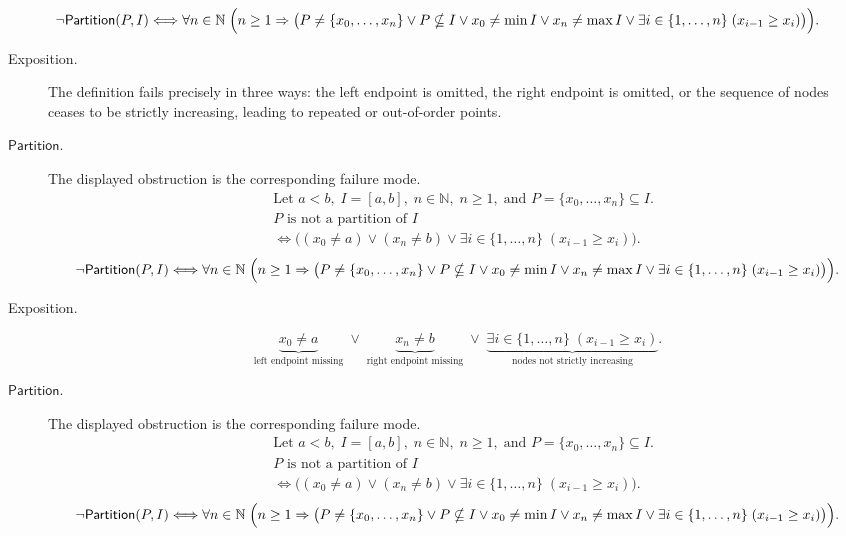 \begin{remark*}
\[
\neg\mathsf{Partition}(P,I) \Longleftrightarrow
\forall n\in\mathbb{N}\;\Bigl(n\ge 1 \Rightarrow
\bigl(P\ne\{x_0,\ldots,x_n\}\lor P\nsubseteq I
\lor x_0\ne\min I \lor x_n\ne\max I
\lor \exists i\in\{1,\ldots,n\}\;(x_{i-1}\ge x_i)\bigr)\Bigr).
\]
\end{remark*}

\begin{remark*}
\begin{description}
  \item[Exposition.]
The definition fails precisely in three ways: the left endpoint is omitted, the right endpoint is omitted, or the sequence of nodes ceases to be strictly increasing, leading to repeated or out-of-order points.


  \item[\(\mathsf{Partition}.\)]
  The displayed obstruction is the corresponding failure mode.
  \[
\begin{aligned}
&\text{Let } a<b,\; I=[a,b],\; n\in\mathbb{N},\; n\ge 1,\; \text{and } P=\{x_0,\ldots,x_n\}\subseteq I.\\
&P \text{ is not a partition of } I\\
&\Longleftrightarrow \bigl((x_0\ne a) \lor (x_n\ne b) \lor \exists i\in\{1,\ldots,n\}\;(x_{i-1}\ge x_i)\bigr).
\end{aligned}
  \]
  \[
\neg\mathsf{Partition}(P,I) \Longleftrightarrow
\forall n\in\mathbb{N}\;\Bigl(n\ge 1 \Rightarrow
\bigl(P\ne\{x_0,\ldots,x_n\}\lor P\nsubseteq I
\lor x_0\ne\min I \lor x_n\ne\max I
\lor \exists i\in\{1,\ldots,n\}\;(x_{i-1}\ge x_i)\bigr)\Bigr).
  \]
\end{description}
\end{remark*}

\begin{remark*}
\begin{description}
  \item[Exposition.]
\[
\underbrace{x_0\ne a}_{\text{left endpoint missing}}
\;\lor\;
\underbrace{x_n\ne b}_{\text{right endpoint missing}}
\;\lor\;
\underbrace{\exists i\in\{1,\ldots,n\}\;(x_{i-1}\ge x_i)}_{\text{nodes not strictly increasing}}.
\]


  \item[\(\mathsf{Partition}.\)]
  The displayed obstruction is the corresponding failure mode.
  \[
\begin{aligned}
&\text{Let } a<b,\; I=[a,b],\; n\in\mathbb{N},\; n\ge 1,\; \text{and } P=\{x_0,\ldots,x_n\}\subseteq I.\\
&P \text{ is not a partition of } I\\
&\Longleftrightarrow \bigl((x_0\ne a) \lor (x_n\ne b) \lor \exists i\in\{1,\ldots,n\}\;(x_{i-1}\ge x_i)\bigr).
\end{aligned}
  \]
  \[
\neg\mathsf{Partition}(P,I) \Longleftrightarrow
\forall n\in\mathbb{N}\;\Bigl(n\ge 1 \Rightarrow
\bigl(P\ne\{x_0,\ldots,x_n\}\lor P\nsubseteq I
\lor x_0\ne\min I \lor x_n\ne\max I
\lor \exists i\in\{1,\ldots,n\}\;(x_{i-1}\ge x_i)\bigr)\Bigr).
  \]
\end{description}
\end{remark*}

